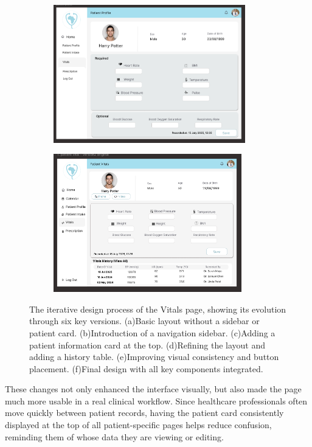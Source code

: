 \begin{figure}[H]\ContinuedFloat %
  \centering
  \begin{subfigure}[t]{0.48\linewidth}
    \centering
    \includegraphics[height=6cm]{images03/3-2-2-figure4e.png}
    \captionsetup{justification=centering}
    \caption{}
    \label{fig:vitals-v5}
  \end{subfigure}\hfill
  \begin{subfigure}[t]{0.48\linewidth}
    \centering
    \includegraphics[height=6cm]{images03/3-2-2-figure4f.png}
    \captionsetup{justification=centering}
    \caption{}
    \label{fig:vitals-v6}
  \end{subfigure}
  \caption{The iterative design process of the Vitals page, showing its evolution through six key versions. (a)Basic layout without a sidebar or patient card. (b)Introduction of a navigation sidebar. (c)Adding a patient information card at the top. (d)Refining the layout and adding a history table. (e)Improving visual consistency and button placement. (f)Final design with all key components integrated.}
  \label{fig:vitals-evolution}
\end{figure}

These changes not only enhanced the interface visually, but also made the page much more usable in a real clinical workflow. Since healthcare professionals often move quickly between patient records, having the patient card consistently displayed at the top of all patient-specific pages helps reduce confusion, reminding them of whose data they are viewing or editing.

